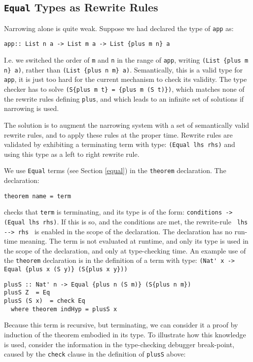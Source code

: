 \documentclass[11pt,twoside]{article}
\begin{document}
\subsection{{\tt Equal} Types as Rewrite Rules}\label{rewrite}

Narrowing alone is quite weak. Suppose we
had declared the type of {\tt app} as:
\begin{verbatim}
app:: List n a -> List m a -> List {plus m n} a 
\end{verbatim}

I.e. we switched the order of {\tt m} and {\tt n} in the range of {\tt app},
writing \verb+(List {plus m n} a)+, rather than \verb+(List {plus n m} a)+.
Semantically, this is a valid type for {\tt app}, it is just too hard for the
current mechanism to check its validity. The type checker
has to solve {\tt (S\{plus m t\} = \{plus m (S t)\})}, which matches none of the
rewrite rules defining {\tt plus}, and which leads to an infinite set of solutions
if narrowing is used.

The solution is to augment the narrowing system with a set of semantically valid
rewrite rules, and to apply these rules at the proper time. Rewrite rules are
validated by exhibiting a terminating term with type: \verb+(Equal lhs rhs)+ and using
this type as a left to right rewrite rule.

We use {\tt Equal} terms (see Section \ref{equal}) in the {\tt theorem} declaration. The declaration:

\begin{verbatim}
theorem name = term
\end{verbatim}
checks that {\tt term} is terminating, and its type is of the form: 
{\tt conditions -> (Equal lhs rhs)}.
If this is so, and the conditions are met, the rewrite-rule \verb+ lhs --> rhs + is enabled
in the scope of the declaration. The declaration has no run-time meaning.
The term is not evaluated at runtime, and only its type is used
in the scope of the declaration, and only at type-checking time. An example use of the {\tt theorem} declaration
is in the definition of a term with type: \verb+(Nat' x -> Equal {plus x (S y)} (S{plus x y}))+
\begin{verbatim}
plusS :: Nat' n -> Equal {plus n (S m)} (S{plus n m})
plusS Z  = Eq
plusS (S x)  = check Eq
  where theorem indHyp = plusS x
\end{verbatim}
Because this term is recursive, but terminating, we can consider it
a proof by induction of the theorem embodied in its type.
To illustrate how this knowledge is used, consider the information
in the type-checking debugger break-point, caused by the {\tt check} clause in
the definition of {\tt plusS} above:
\end{document}
